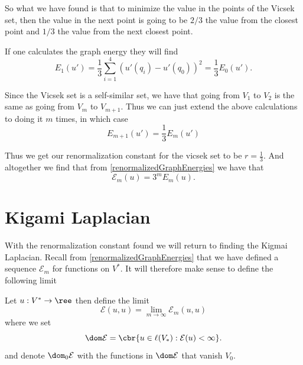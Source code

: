 So what we have found is that to minimize the value in the points of the Vicsek set, then the value in the next point is going to be $2/3$ the value from the closest point and $1/3$ the value from the next closest point. 

If one calculates the graph energy they will find
\begin{equation}
	E_1(u') =\frac{1}{3}\sum_{i = 1}^{4}(u'(q_i) - u'(q_0))^2 = \frac{1}{3}E_0(u').
\end{equation}

Since the Vicsek set is a self-similar set, we have that going from $V_1$ to $V_2$ is the same as going from $V_m$ to $V_{m+1}$. Thus we can just extend the above calculations to doing it $m$ times, in which case
\begin{equation}
	E_{m+1}(u') = \frac{1}{3}E_m(u')
\end{equation}

Thus we get our renormalization constant for the vicsek set to be $r = \frac{1}{3}$. And altogether we find that from \cref{renormalizedGraphEnergies} we have that 
\begin{equation}
	\mathcal{E}_{m}(u) = 3^{m} E_{m}(u).
\end{equation}


\section{Kigami Laplacian}
With the renormalization constant found we will return to finding the Kigmai Laplacian. Recall from \cref{renormalizedGraphEnergies} that we have defined a sequence $\mathcal{E}_m$ for functions on $V^{*}$. It will therefore make sense to define the following limit
\begin{defi}\label{renormalizedGraphEnergiesLimit} Let $u: V^{*} \to \ree$ then define the limit
	\begin{equation}
		\mathcal{E}(u, u) = \lim_{m \to \infty} \mathcal{E}_{m}(u, u)
	\end{equation}
	where we set
	\begin{equation}
		\dom \mathcal{E} = \cbr{u \in \ell(V_{*}) : \mathcal{E}(u) < \infty}.
	\end{equation}
	and denote $\dom_0 \mathcal{E}$ with the functions in $\dom \mathcal{E}$ that vanish $V_0$.
\end{defi}

